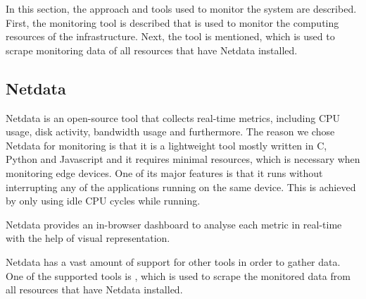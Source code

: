 \documentclass{article}
\begin{document}
        In this section, the approach and tools used to monitor the system are described.
        First, the monitoring tool  is described that is used to monitor the computing resources of the infrastructure. Next, the tool  is mentioned, which is used to scrape monitoring data of all resources that have Netdata installed.
            
        \subsection{Netdata}
        \label{sec:netdata-monitoring}

            Netdata \cite{netdataGettingStartedLearn2023} is an open-source tool that collects real-time metrics, including CPU usage, disk activity, bandwidth usage and furthermore.
            The reason we chose Netdata for monitoring is that it is a lightweight tool mostly written in C, Python and Javascript and it requires minimal resources, which is necessary when monitoring edge devices.
            One of its major features is that it runs without interrupting any of the applications running on the same device. This is achieved by only using idle CPU cycles while running.

            Netdata provides an in-browser dashboard to analyse each metric in real-time with the help of visual representation. 

            Netdata has a vast amount of support for other tools in order to gather data. 
            One of the supported tools is , which is used to scrape the monitored data from all resources that have Netdata installed.
\end{document}
